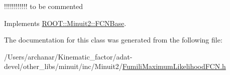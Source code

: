!!!!!!!!!!!! to be commented 

Implements \mbox{\hyperlink{classROOT_1_1Minuit2_1_1FCNBase_a04ef08ddad92ce8d89d498efbe021c39}{R\+O\+O\+T\+::\+Minuit2\+::\+F\+C\+N\+Base}}.



The documentation for this class was generated from the following file\+:\begin{DoxyCompactItemize}
\item 
/\+Users/archanar/\+Kinematic\+\_\+factor/adat-\/devel/other\+\_\+libs/minuit/inc/\+Minuit2/\mbox{\hyperlink{adat-devel_2other__libs_2minuit_2inc_2Minuit2_2FumiliMaximumLikelihoodFCN_8h}{Fumili\+Maximum\+Likelihood\+F\+C\+N.\+h}}\end{DoxyCompactItemize}

